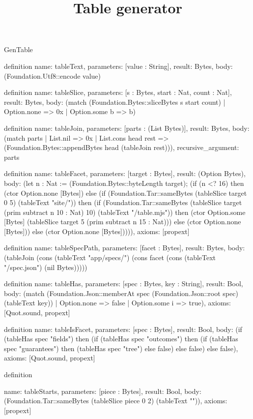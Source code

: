\begin{lexlean}{GenTable}
\title{Table generator}
\begin{semanticmodule}
definition{
  name: tableText,
  parameters: [value : String],
  result: Bytes,
  body: (Foundation.Utf8::encode value)
}

definition{
  name: tableSlice,
  parameters: [s : Bytes, start : Nat, count : Nat],
  result: Bytes,
  body: (match (Foundation.Bytes::sliceBytes s start count)
    | Option.none => 0x
    | Option.some b => b)
}

definition{
  name: tableJoin,
  parameters: [parts : (List Bytes)],
  result: Bytes,
  body: (match parts
    | List.nil => 0x
    | List.cons head rest => (Foundation.Bytes::appendBytes head (tableJoin rest))),
  recursive_argument: parts
}

definition{
  name: tableFacet,
  parameters: [target : Bytes],
  result: (Option Bytes),
  body: (let n : Nat := (Foundation.Bytes::byteLength target); (if (n <? 16) then (ctor Option.none [Bytes]) else (if (Foundation.Tar::sameBytes (tableSlice target 0 5) (tableText "site/")) then (if (Foundation.Tar::sameBytes (tableSlice target (prim subtract n 10 : Nat) 10) (tableText "/table.mjs")) then (ctor Option.some [Bytes] (tableSlice target 5 (prim subtract n 15 : Nat))) else (ctor Option.none [Bytes])) else (ctor Option.none [Bytes])))),
  axioms: [propext]
}

definition{
  name: tableSpecPath,
  parameters: [facet : Bytes],
  result: Bytes,
  body: (tableJoin (cons (tableText "app/specs/") (cons facet (cons (tableText "/spec.json") (nil Bytes)))))
}

definition{
  name: tableHas,
  parameters: [spec : Bytes, key : String],
  result: Bool,
  body: (match (Foundation.Json::memberAt spec (Foundation.Json::root spec) (tableText key))
    | Option.none => false
    | Option.some i => true),
  axioms: [Quot.sound, propext]
}

definition{
  name: tableIsFacet,
  parameters: [spec : Bytes],
  result: Bool,
  body: (if (tableHas spec "fields") then (if (tableHas spec "outcomes") then (if (tableHas spec "guarantees") then (tableHas spec "tree") else false) else false) else false),
  axioms: [Quot.sound, propext]
}

definition{
  name: tableStarts,
  parameters: [piece : Bytes],
  result: Bool,
  body: (Foundation.Tar::sameBytes (tableSlice piece 0 2) (tableText "{\n")),
  axioms: [propext]
}

}
\end{semanticmodule}
\end{lexlean}

